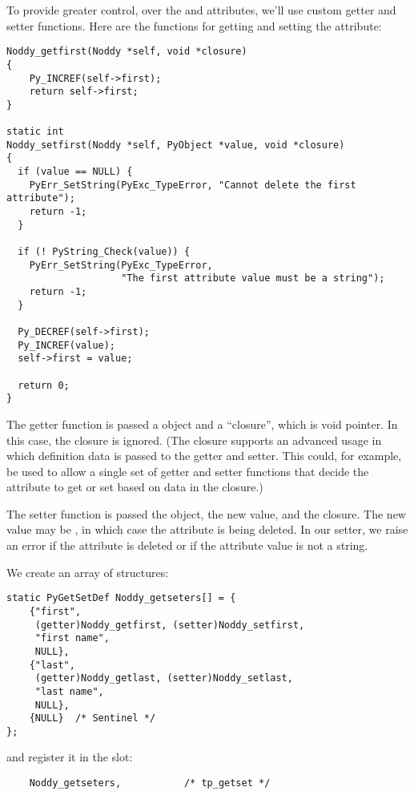 

To provide greater control, over the  and 
attributes, we'll use custom getter and setter functions.  Here are
the functions for getting and setting the  attribute:

\begin{verbatim}
Noddy_getfirst(Noddy *self, void *closure)
{
    Py_INCREF(self->first);
    return self->first;
}

static int
Noddy_setfirst(Noddy *self, PyObject *value, void *closure)
{
  if (value == NULL) {
    PyErr_SetString(PyExc_TypeError, "Cannot delete the first attribute");
    return -1;
  }
  
  if (! PyString_Check(value)) {
    PyErr_SetString(PyExc_TypeError, 
                    "The first attribute value must be a string");
    return -1;
  }
      
  Py_DECREF(self->first);
  Py_INCREF(value);
  self->first = value;    

  return 0;
}
\end{verbatim}

The getter function is passed a  object and a
``closure'', which is void pointer. In this case, the closure is
ignored. (The closure supports an advanced usage in which definition
data is passed to the getter and setter. This could, for example, be
used to allow a single set of getter and setter functions that decide
the attribute to get or set based on data in the closure.)

The setter function is passed the  object, the new value,
and the closure. The new value may be \NULL, in which case the
attribute is being deleted.  In our setter, we raise an error if the
attribute is deleted or if the attribute value is not a string.

We create an array of  structures:

\begin{verbatim}
static PyGetSetDef Noddy_getseters[] = {
    {"first", 
     (getter)Noddy_getfirst, (setter)Noddy_setfirst,
     "first name",
     NULL},
    {"last", 
     (getter)Noddy_getlast, (setter)Noddy_setlast,
     "last name",
     NULL},
    {NULL}  /* Sentinel */
};
\end{verbatim}

and register it in the  slot:

\begin{verbatim}
    Noddy_getseters,           /* tp_getset */
\end{verbatim}

